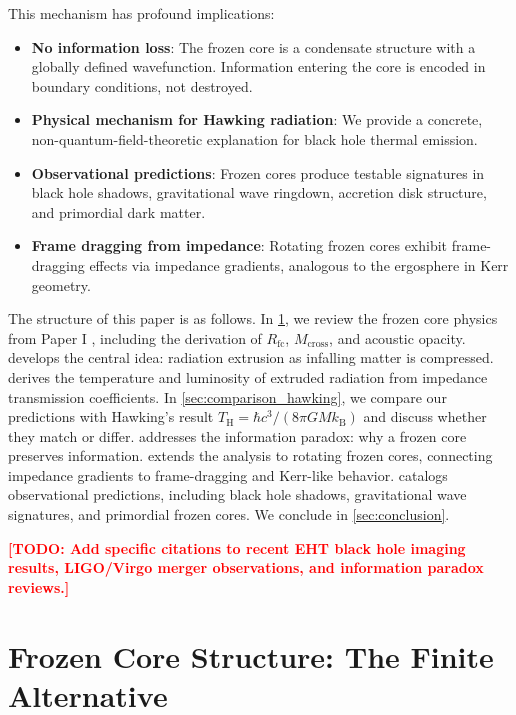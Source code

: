 \documentclass[12pt,a4paper]{article}
\newcommand{\TODO}[1]{\textcolor{red}{\textbf{[TODO: #1]}}}
\newcommand{\Rfc}{R_\text{fc}}
\newcommand{\Mcross}{M_\text{cross}}
\newcommand{\TH}{T_\text{H}}
\theoremstyle{definition}
\begin{document}
This mechanism has profound implications:
\begin{itemize}
  \item \textbf{No information loss}: The frozen core is a condensate structure with a globally defined wavefunction. Information entering the core is encoded in boundary conditions, not destroyed.
  \item \textbf{Physical mechanism for Hawking radiation}: We provide a concrete, non-quantum-field-theoretic explanation for black hole thermal emission.
  \item \textbf{Observational predictions}: Frozen cores produce testable signatures in black hole shadows, gravitational wave ringdown, accretion disk structure, and primordial dark matter.
  \item \textbf{Frame dragging from impedance}: Rotating frozen cores exhibit frame-dragging effects via impedance gradients, analogous to the ergosphere in Kerr geometry.
\end{itemize}

The structure of this paper is as follows. In \cref{sec:frozen_core_structure}, we review the frozen core physics from Paper I \cite{PlanckFieldI}, including the derivation of $\Rfc$, $\Mcross$, and acoustic opacity.  develops the central idea: radiation extrusion as infalling matter is compressed.  derives the temperature and luminosity of extruded radiation from impedance transmission coefficients. In \cref{sec:comparison_hawking}, we compare our predictions with Hawking's result $\TH = \hbar c^3/(8\pi G M k_\text{B})$ and discuss whether they match or differ.  addresses the information paradox: why a frozen core preserves information.  extends the analysis to rotating frozen cores, connecting impedance gradients to frame-dragging and Kerr-like behavior.  catalogs observational predictions, including black hole shadows, gravitational wave signatures, and primordial frozen cores. We conclude in \cref{sec:conclusion}.

\TODO{Add specific citations to recent EHT black hole imaging results, LIGO/Virgo merger observations, and information paradox reviews.}

\section{Frozen Core Structure: The Finite Alternative}
\label{sec:frozen_core_structure}
\end{document}

